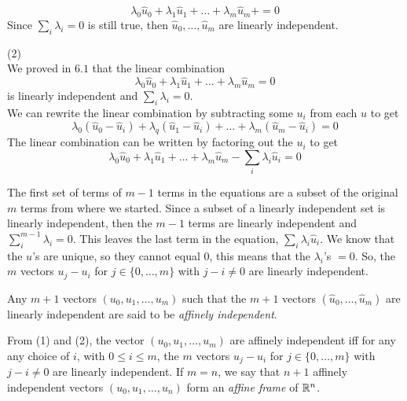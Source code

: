 \documentclass[12pt]{article}
\begin{document}
$$\lambda_0 \hat{u}_0  + \lambda_1 \hat{u}_1  + \ldots + \lambda_m \hat{u}_m  + = 0$$ Since $\sum_{i} \lambda_i = 0$ is still true, then $\hat{u}_0, \ldots, \hat{u}_m$ are linearly independent.   


\medskip
(2) \\
We proved in $6.1$ that the linear combination $$\lambda_0 \hat{u}_0  + \lambda_1 \hat{u}_1  + \ldots + \lambda_m \hat{u}_m  = 0$$ is linearly independent and $\sum_{i} \lambda_i = 0$. \\

We can rewrite the linear combination by subtracting some $u_i$ from each $u$ to get $$\lambda_0 (\hat{u}_0 - \hat{u}_i)  + \lambda_q (\hat{u}_1 - \hat{u}_i)+ \ldots + \lambda_m (\hat{u}_m - \hat{u}_i) = 0$$ The linear combination can be written by factoring out the $u_i$ to get  $$\lambda_0 \hat{u}_0  + \lambda_1 \hat{u}_1 + \ldots + \lambda_m \hat{u}_m  -  \sum_{i} \lambda_i \hat{u}_i= 0$$

The first set of terms of $m-1$ terms in the equations are a subset of the original $m$ terms from where we started. Since a subset of a linearly independent set is linearly independent, then the $m-1$ terms are linearly independent and $\sum_{i}^{m-1} \lambda_i =0$. This leaves the last term in the equation, $\sum_{i} \lambda_i \hat{u}_i$. We know that the $u$'s are unique, so they cannot equal $0$, this means that the $\lambda_i$'s $=0$. So, the
$m$ vectors $u_j - u_i$  for $j \in \{0, \ldots, m\}$ with $j - i \not = 0$
are linearly independent. 

\medskip
Any $m + 1$ vectors  $(u_0, u_1, \ldots, u_{m })$ such that
the  $m + 1$ vectors
$(\widehat{u}_0, \ldots,  \widehat{u}_m)$ are linearly independent
are said to be {\it affinely independent\/}.

\medskip
From (1) and (2), the vector $(u_0, u_1, \ldots, u_{m })$ 
are affinely independent iff
for any  any choice of $i$, with $0 \leq i \leq m$, the
$m$ vectors $u_j - u_i$  for $j \in \{0, \ldots, m\}$ with $j - i \not = 0$
are linearly independent.
If $m = n$,  we say that $n + 1$ affinely independent 
vectors  $(u_0, u_1, \ldots, u_{n })$ form an {\it affine frame\/} of $\mathbb{R}^n$. 
\end{document}
